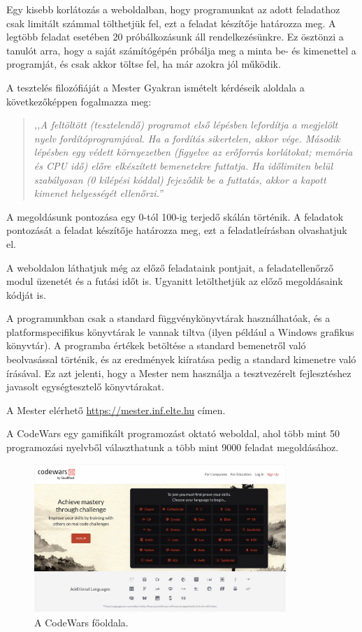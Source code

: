 Egy kisebb korlátozás a weboldalban, hogy programunkat az adott feladathoz csak limitált számmal tölthetjük fel, ezt a feladat készítője határozza meg. A legtöbb feladat esetében 20 próbálkozásunk áll rendelkezésünkre. Ez ösztönzi a tanulót arra, hogy a saját számítógépén próbálja meg a minta be- és kimenettel a programját, és csak akkor töltse fel, ha már azokra jól működik.

A tesztelés filozófiáját a Mester Gyakran ismételt kérdéseik aloldala a következőképpen fogalmazza meg:
\begin{quotation}
    \textsl{,,A feltöltött (tesztelendő) programot első lépésben lefordítja a megjelölt nyelv fordítóprogramjával. Ha a fordítás sikertelen, akkor vége. Második lépésben egy védett környezetben (figyelve az erőforrás korlátokat; memória és CPU idő) előre elkészített bemenetekre futtatja. Ha időlimiten belül szabályosan (0 kilépési kóddal) fejeződik be a futtatás, akkor a kapott kimenet helyességét ellenőrzi.''} \cite{elte-mester_gyik}
\end{quotation}
A megoldásunk pontozása egy 0-tól 100-ig terjedő skálán történik. A feladatok pontozását a feladat készítője határozza meg, ezt a feladatleírásban olvashatjuk el.

A weboldalon láthatjuk még az előző feladataink pontjait, a feladatellenőrző modul üzenetét és a futási időt is. Ugyanitt letölthetjük az előző megoldásaink kódját is.

A programunkban csak a standard függvénykönyvtárak használhatóak, és a platformspecifikus könyvtárak le vannak tiltva (ilyen például a Windows grafikus könyvtár). A programba értékek betöltése a standard bemenetről való beolvasással történik, és az eredmények kiíratása pedig a standard kimenetre való írásával. Ez azt jelenti, hogy a Mester nem használja a tesztvezérelt fejlesztéshez javasolt egységtesztelő könyvtárakat.

A Mester elérhető \url{https://mester.inf.elte.hu} címen.


A CodeWars egy gamifikált programozást oktató weboldal, ahol több mint 50 programozási nyelvből választhatunk a több mint 9000 feladat megoldásához. \cite{codewars}

\begin{figure}[h]
    \centering
    \includegraphics[width=0.85\textwidth]{images/codewars_homepage.png}
    \caption{A CodeWars főoldala.}
    \label{fig:codewars_homepage}
\end{figure}


